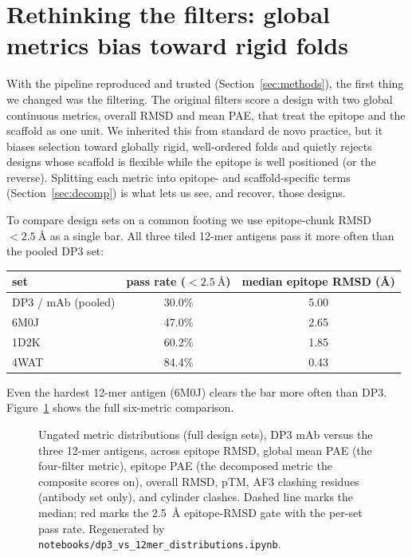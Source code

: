 \section{Rethinking the filters: global metrics bias toward rigid folds}\label{sec:filtering}
With the pipeline reproduced and trusted (Section~\ref{sec:methods}), the first thing we
changed was the filtering. The original filters score a design with two global continuous
metrics, overall RMSD and mean PAE, that treat the epitope and the scaffold as one unit. We
inherited this from standard de novo practice, but it biases selection toward globally rigid,
well-ordered folds and quietly rejects designs whose scaffold is flexible while the epitope
is well positioned (or the reverse). Splitting each metric into epitope- and scaffold-specific
terms (Section~\ref{sec:decomp}) is what lets us see, and recover, those designs.

To compare design sets on a common footing we use epitope-chunk RMSD $< \SI{2.5}{\angstrom}$
as a single bar. All three tiled 12-mer antigens pass it more often than the pooled DP3 set:

\begin{center}
\begin{tabular}{lcc}
\toprule
set & pass rate ($<\SI{2.5}{\angstrom}$) & median epitope RMSD (\si{\angstrom}) \\
\midrule
DP3 / mAb (pooled) & 30.0\% & 5.00 \\
6M0J               & 47.0\% & 2.65 \\
1D2K               & 60.2\% & 1.85 \\
4WAT               & 84.4\% & 0.43 \\
\bottomrule
\end{tabular}
\end{center}

\noindent
Even the hardest 12-mer antigen (6M0J) clears the bar more often than DP3. Figure~\ref{fig:passrates}
shows the full six-metric comparison.

\begin{figure}[h]\centering
{}
\caption{Ungated metric distributions (full design sets), DP3 mAb versus the three 12-mer
antigens, across epitope RMSD, global mean PAE (the four-filter metric), epitope PAE (the
decomposed metric the composite scores on), overall RMSD, pTM, AF3 clashing residues
(antibody set only), and cylinder clashes. Dashed line marks the median; red marks the
\SI{2.5}{\angstrom} epitope-RMSD gate with the per-set pass rate. Regenerated by
\texttt{notebooks/dp3\_vs\_12mer\_distributions.ipynb}.}
\label{fig:passrates}
\end{figure}

